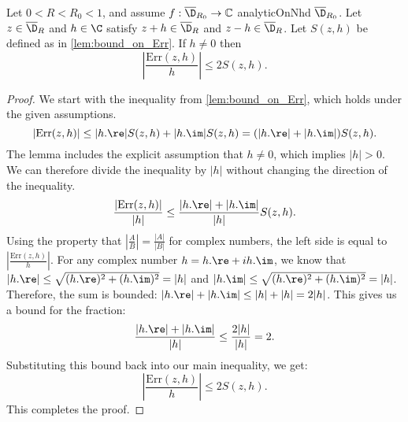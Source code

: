 \begin{lemma}\label{lem:bound_on_Err_ratio}
\leanok
Let $0<R<R_0<1$, and assume $f:\overline{\D}_{R_0}\to\mathbb{C}$ analyticOnNhd $\overline{\D}_{R_0}$. Let $z \in \overline{\D}_R$ and $h\in\C$ satisfy $z+h \in \overline{\D}_R$ and $z-h \in \overline{\D}_R$. Let $S(z,h)$ be defined as in \cref{lem:bound_on_Err}. If $h \neq 0$ then
\[ \left|\frac{\mathrm{Err}(z,h)}{h}\right| \le 2S(z,h). \]
\end{lemma}
\begin{proof}
\leanok
We start with the inequality from \cref{lem:bound_on_Err}, which holds under the given assumptions.
\[ |\mathrm{Err}(z,h)| \le |h.\re| S(z,h) + |h.\im|S(z,h) = (|h.\re| + |h.\im|) S(z,h). \]
The lemma includes the explicit assumption that $h \neq 0$, which implies $|h| > 0$. We can therefore divide the inequality by $|h|$ without changing the direction of the inequality.
\[ \frac{|\mathrm{Err}(z,h)|}{|h|} \le \frac{|h.\re| + |h.\im|}{|h|} S(z,h). \]
Using the property that $|\frac{A}{B}| = \frac{|A|}{|B|}$ for complex numbers, the left side is equal to $\left|\frac{\mathrm{Err}(z,h)}{h}\right|$.
For any complex number $h = h.\re + i h.\im$, we know that $|h.\re| \le \sqrt{(h.\re)^2 + (h.\im)^2} = |h|$ and $|h.\im| \le \sqrt{(h.\re)^2 + (h.\im)^2} = |h|$.
Therefore, the sum is bounded: $|h.\re| + |h.\im| \le |h| + |h| = 2|h|$.
This gives us a bound for the fraction:
\[ \frac{|h.\re| + |h.\im|}{|h|} \le \frac{2|h|}{|h|} = 2. \]
Substituting this bound back into our main inequality, we get:
\[ \left|\frac{\mathrm{Err}(z,h)}{h}\right| \le 2 S(z,h). \]
This completes the proof.
\end{proof}


